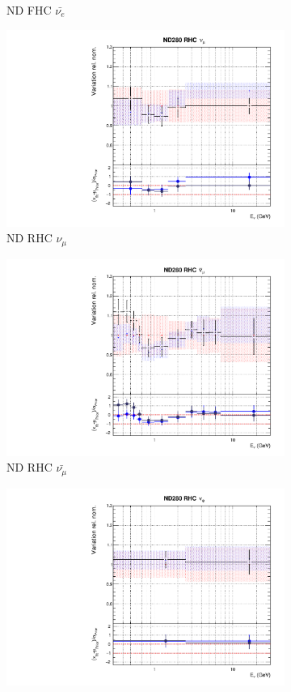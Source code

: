 \begin{figure}[t]
\begin{subfigure}{0.42\textwidth}
  \caption{ND FHC $\bar{\nu_{e}}$}
\end{subfigure}
\begin{subfigure}{0.42\textwidth}
  \centering
  \includegraphics[width=0.75\linewidth]{figs/rhcmpdat28flux_4}
  \caption{ND RHC $\nu_{\mu}$}
\end{subfigure}
\begin{subfigure}{0.42\textwidth}
  \centering
  \includegraphics[width=0.75\linewidth]{figs/rhcmpdat28flux_5}
  \caption{ND RHC $\bar{\nu_{\mu}}$}
\end{subfigure}
\begin{subfigure}{0.42\textwidth}
  \centering
  \includegraphics[width=0.75\linewidth]{figs/rhcmpdat28flux_6}

\end{subfigure}
\end{figure}
